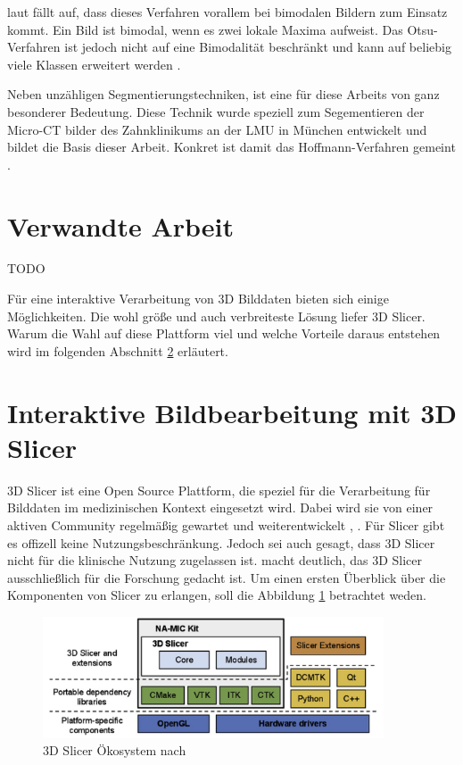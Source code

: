 laut \citet[Seite264]{lehmann2013bildverarbeitung} fällt auf, dass dieses
Verfahren vorallem bei bimodalen Bildern zum Einsatz kommt. Ein Bild ist bimodal,
wenn es zwei lokale Maxima aufweist. Das Otsu-Verfahren ist jedoch nicht auf eine
Bimodalität beschränkt und kann auf beliebig viele Klassen erweitert werden \citep[vgl.][Seite264]{lehmann2013bildverarbeitung}.

Neben unzähligen Segmentierungstechniken, ist eine für diese Arbeits von ganz
besonderer Bedeutung. Diese Technik wurde speziell zum Segementieren der Micro-CT
bilder des Zahnklinikums an der LMU in München entwickelt und bildet die Basis dieser
Arbeit. Konkret ist damit das Hoffmann-Verfahren gemeint \citep{hoffmann2020}.

\section{Verwandte Arbeit}
\label{sec:verwwandte_arbeit} TODO

Für eine interaktive Verarbeitung von 3D Bilddaten bieten sich einige
Möglichkeiten. Die wohl größe und auch verbreiteste Lösung liefer 3D Slicer.
Warum die Wahl auf diese Plattform viel und welche Vorteile daraus entstehen
wird im folgenden Abschnitt \ref{sec:3d_slicer} erläutert.

\pagebreak

\section{Interaktive Bildbearbeitung mit 3D Slicer}
\label{sec:3d_slicer} 3D Slicer ist eine Open Source Plattform, die speziel für
die Verarbeitung für Bilddaten im medizinischen Kontext eingesetzt wird. Dabei wird
sie von einer aktiven Community regelmäßig gewartet und weiterentwickelt \citep[vgl.][]{slicer2024},
\citep[vgl.][]{fedorov2012slicer}. Für Slicer gibt es offizell keine Nutzungsbeschränkung.
Jedoch sei auch gesagt, dass 3D Slicer nicht für die klinische Nutzung zugelassen
ist. \citet{fedorov2012slicer} macht deutlich, das 3D Slicer ausschließlich für
die Forschung gedacht ist. Um einen ersten Überblick über die Komponenten von Slicer
zu erlangen, soll die Abbildung \ref{fig:3d_slicer_oekosystem} betrachtet weden.

\begin{figure}[h]
	\centering
	\includegraphics[width=0.9\textwidth]{img/3d_slicer_overview.jpg}
	\caption{3D Slicer Ökosystem nach \citet[Seite 1326]{fedorov2012slicer}}
	\label{fig:3d_slicer_oekosystem}
\end{figure}

